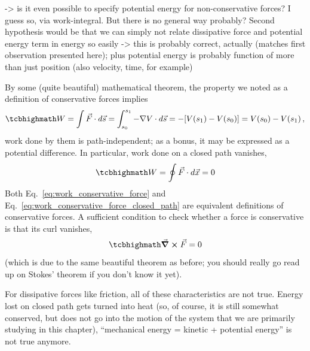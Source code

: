 \documentclass[../class_mech_main.tex]{subfiles}
\begin{document}
->  is it even possible to specify potential energy for non-conservative forces? I guess so, via work-integral. But there is no general way probably? Second hypothesis would be that we can simply not relate dissipative force and potential energy term in energy so easily -> this is probably correct, actually (matches first observation presented here); plus potential energy is probably function of more than just position (also velocity, time, for example)


By some (quite beautiful) mathematical theorem, the property we noted as a definition of conservative forces implies
\begin{equation}\label{eq:work_conservative_force}
	\eqbox{
		W = \int \vec{F} \cdot d\vec{s} = \int_{s_0}^{s_1} - \nabla V \cdot d\vec{s} = - [V(s_1) - V(s_0)] = V(s_0) - V(s_1)
	} \, ,
\end{equation}
work done by them is path-independent; as a bonus, it may be expressed as a potential difference. In particular, work done on a closed path vanishes,
\begin{equation}\label{eq:work_conservative_force_closed_path}
	\eqbox{
		W = \oint \vec{F} \cdot d\vec{x} = 0
	}
\end{equation}
Both Eq.~\eqref{eq:work_conservative_force} and Eq.~\eqref{eq:work_conservative_force_closed_path} are equivalent definitions of conservative forces. A sufficient condition to check whether a force is conservative is that its curl vanishes,
\begin{equation}\label{eq:conservative_force_condition}
	\eqbox{
		\curl \vec{F} = 0
	}
\end{equation}
(which is due to the same beautiful theorem as before; you should really go read up on Stokes' theorem if you don't know it yet).

For dissipative forces like friction, all of these characteristics are not true. Energy lost on closed path gets turned into heat (so, of course, it is still somewhat conserved, but does not go into the motion of the system that we are primarily studying in this chapter), \enquote{mechanical energy = kinetic + potential energy} is not true anymore.\\


\end{document}
